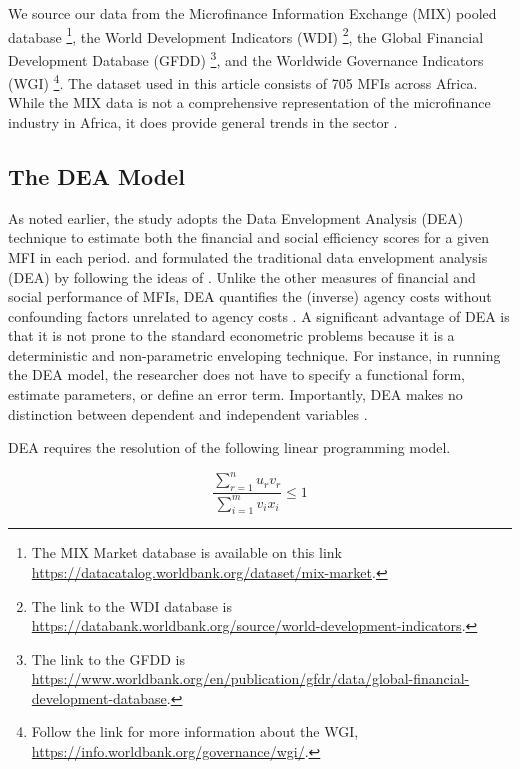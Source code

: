 \documentclass[a4paper, nobind]{templates/ociamthesis}
\begin{document}
We source our data from the Microfinance Information Exchange (MIX) pooled database \footnote{The MIX Market database is available on this link \url{https://datacatalog.worldbank.org/dataset/mix-market}.}, the World Development Indicators (WDI) \footnote{The link to the WDI database is \url{https://databank.worldbank.org/source/world-development-indicators}.}, the Global Financial Development Database (GFDD) \footnote{The link to the GFDD is \url{https://www.worldbank.org/en/publication/gfdr/data/global-financial-development-database}.}, and the Worldwide Governance Indicators (WGI) \footnote{Follow the link for more information about the WGI, \url{https://info.worldbank.org/governance/wgi/}.}. The dataset used in this article consists of 705 MFIs across Africa. While the MIX data is not a comprehensive representation of the microfinance industry in Africa, it does provide general trends in the sector \autocite{jarotschkin2013microfinance}.

\hypertarget{the-dea-model}{%
\subsection{The DEA Model}\label{the-dea-model}}

As noted earlier, the study adopts the Data Envelopment Analysis (DEA) technique to estimate both the financial and social efficiency scores for a given MFI in each period. \textcite{charnes1978measuring} and \textcite{charnes1981evaluating} formulated the traditional data envelopment analysis (DEA) by following the ideas of \textcite{farrel1957measurement}. Unlike the other measures of financial and social performance of MFIs, DEA quantifies the (inverse) agency costs without confounding factors unrelated to agency costs \autocite{berger2006capital}. A significant advantage of DEA is that it is not prone to the standard econometric problems because it is a deterministic and non-parametric enveloping technique. For instance, in running the DEA model, the researcher does not have to specify a functional form, estimate parameters, or define an error term. Importantly, DEA makes no distinction between dependent and independent variables \autocite{zhou2007non}.

DEA requires the resolution of the following linear programming model.

\begin{equation}
\frac{\sum_{r=1}^{n} u_{r}v_{r}}{\sum_{i=1}^{m} v_{i}x_{i}} \leqslant 1
\end{equation}
\end{document}
